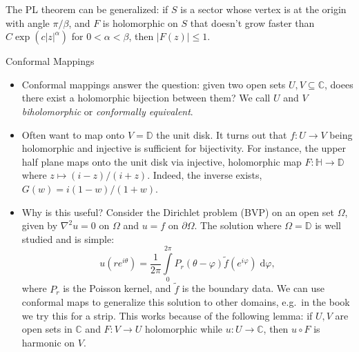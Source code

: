 \documentclass[11pt,
        usenames, %
        dvipsnames %
    ]{report}
\newcommand*{\abs}[1]{\left|#1\right|}
\newcommand*{\p}[1]{\left(#1\right)}
\begin{document}
\begin{itemize}
        The PL theorem can be generalized: if $S$ is a sector whose vertex is at
        the origin with angle $\pi/\beta$, and $F$ is holomorphic on $S$ that
        doesn't grow faster than $C\exp\p{c\abs{z}^\alpha}$ for $0 < \alpha <
        \beta$, then $\abs{F(z)} \leq 1$.
\end{itemize}

Conformal Mappings
\begin{itemize}
    \item Conformal mappings answer the question: given two open sets $U, V
        \subseteq \mathbb{C}$, doees there exist a holomorphic bijection between
        them? We call $U$ and $V$ \emph{biholomorphic}
        or \emph{conformally equivalent}.

    \item Often want to map onto $V = \mathbb{D}$ the unit disk. It turns out
        that $f: U \to V$ being holomorphic and injective is sufficient for
        bijectivity. For instance, the upper half plane maps onto the unit disk
        via injective, holomorphic map $F: \mathbb{H} \to \mathbb{D}$ where $z
        \mapsto (i - z) / (i + z)$. Indeed, the inverse exists, $G(w) = i\p{1 -
        w} / (1 + w)$.

    \item Why is this useful? Consider the Dirichlet problem (BVP) on an open
        set $\Omega$, given by $\nabla^2 u = 0$ on $\Omega$ and $u = f$ on
        $\partial\Omega$. The solution where $\Omega = \mathbb{D}$ is well
        studied and is simple:
        \begin{equation}
            u\p{re^{i\theta}} = \frac{1}{2\pi}\int\limits_{0}^{2\pi}
                P_r\p{\theta - \varphi} \tilde{f}\p{e^{i\varphi}}
                \;\mathrm{d}\varphi,
        \end{equation}
        where $P_r$ is the Poisson kernel, and $\tilde{f}$ is the boundary data.
        We can use conformal maps to generalize this solution to other domains,
        e.g.\ in the book we try this for a strip. This works because of the
        following lemma: if $U, V$ are open sets in $\mathbb{C}$ and $F: V \to
        U$ holomorphic while $u: U \to \mathbb{C}$, then $u \circ F$ is harmonic
        on $V$.


\end{itemize}
\end{document}
